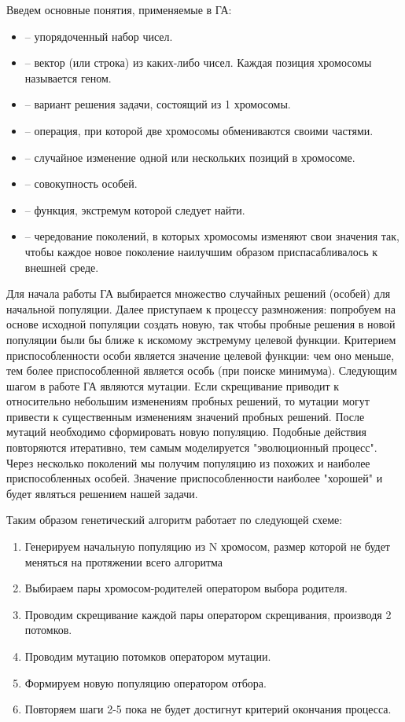 Введем основные понятия, применяемые в ГА:
\begin{itemize}
	\item {} -- упорядоченный набор чисел.
	\item {} -- вектор (или строка) из каких-либо чисел. Каждая позиция хромосомы называется геном.
	\item {} -- вариант решения задачи, состоящий из 1 хромосомы.
	\item {} -- операция, при которой две хромосомы обмениваются своими частями.
	\item {} -- случайное изменение одной или нескольких позиций в хромосоме.
	\item {} -- совокупность особей.
	\item {} -- функция, экстремум которой следует найти.
	\item {} -- чередование поколений, в которых хромосомы изменяют свои значения так, чтобы каждое новое поколение наилучшим образом приспасабливалось к внешней среде.
\end{itemize}

Для начала работы ГА выбирается множество случайных решений (особей) для начальной популяции. Далее приступаем к процессу размножения: попробуем на основе исходной популяции создать новую, так чтобы пробные решения в новой популяции были бы ближе к искомому экстремуму целевой функции. Критерием приспособленности особи является значение целевой функции: чем оно меньше, тем более приспособленной является особь (при поиске минимума). Следующим шагом в работе ГА являются мутации. Если скрещивание приводит к относительно небольшим изменениям пробных решений, то мутации могут привести к существенным изменениям значений пробных решений. После мутаций необходимо сформировать новую популяцию. Подобные действия повторяются итеративно, тем самым моделируется "эволюционный процесс". Через несколько поколений мы получим популяцию из похожих и наиболее приспособленных особей. Значение приспособленности наиболее "хорошей" и будет являться решением нашей задачи.

Таким образом генетический алгоритм работает по следующей схеме:
\begin{enumerate}
	\item Генерируем начальную популяцию из N хромосом, размер которой не будет меняться на протяжении всего алгоритма
	\item Выбираем пары хромосом-родителей оператором выбора родителя.
	\item Проводим скрещивание каждой пары оператором скрещивания, производя 2 потомков.
	\item Проводим мутацию потомков оператором мутации.
	\item Формируем новую популяцию оператором отбора.
	\item Повторяем шаги 2-5 пока не будет достигнут критерий окончания процесса.
\end{enumerate}

